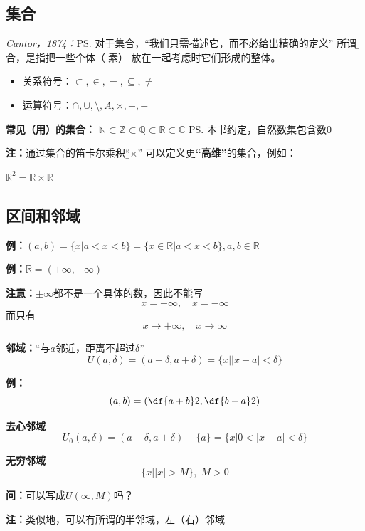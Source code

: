 \subsection{集合}

{\it Cantor，1874：}\ps{对于集合，“我们只需描述它，而不必给出精确的定义”}
所谓{\b 集合}，是指把一些个体（{\b 元素}） 放在一起考虑时它们形成的整体。
\begin{itemize}
  \item 关系符号：$\subset, \in, =, \subseteq, \neq$
  \item 运算符号：$\cap,\cup, \setminus, \bar{A}, \times, +, - $
\end{itemize}
	
{\bf 常见（用）的集合：}
$\mathbb{N}\subset\mathbb{Z}\subset\mathbb{Q}\subset\mathbb{R}\subset\mathbb{C}$
\ps{本书约定，自然数集包含数$0$}
	
{\bf 注：}通过集合的笛卡尔乘积{\b “$\times$”} 可以定义更{\bf “高维”}的集合，例如：\\
	\centerline{$\mathbb{R}^2=\mathbb{R}\times\mathbb{R}$}

\subsection{区间和邻域}

{\bf 例：}$(a,b)=\{x|a<x<b\}=\{x\in\mathbb{R}|a<x<b\},a,b\in\mathbb{R}$

{\bf 例：}$\mathbb{R}=(+\infty,-\infty)$

{\bf 注意：}$\pm\infty$都不是一个具体的数，因此不能写
$$x=+\infty,\quad x=-\infty$$
而只有
$$x\to+\infty,\quad x\to\infty$$

{\bf 邻域：}“与$a$邻近，距离不超过$\delta$”
$$U(a,\delta)=(a-\delta,a+\delta)=\{x||x-a|<\delta\}$$

{\bf 例：}
$$(a,b)=\left(\df{a+b}2,\df{b-a}2\right)$$

{\bf 去心邻域}
$$U_0(a,\delta)=(a-\delta,a+\delta)-\{a\}=\{x|0<|x-a|<\delta\}$$

{\bf 无穷邻域}
$$\{x||x|>M\},\;M>0$$

{\bf 问：}可以写成$U(\infty,M)$吗？

{\bf 注：}类似地，可以有所谓的半邻域，左（右）邻域


